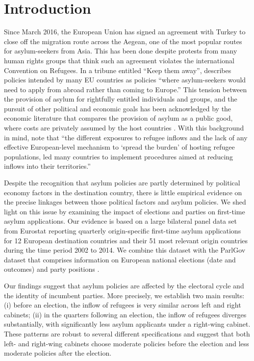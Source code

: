 \documentclass[a4paper,12pt]{article}
\begin{document}
\section{Introduction}\label{Introduction}
Since March 2016, the European Union has signed an agreement with Turkey to close off the migration route across the Aegean, one of the most popular routes for asylum-seekers from Asia. This has been done despite protests from many human rights groups that think such an agreement violates the international Convention on Refugees. In a tribune entitled ``Keep them away'', \textit{\cite{Economist2017}} describes policies intended by many EU countries as policies ``where asylum-seekers would need to apply from abroad rather than coming to Europe.'' This tension between the provision of asylum for rightfully entitled individuals and groups, and the pursuit of other political and economic goals has been acknowledged by the economic literature that compares the provision of asylum as a public good, where costs are privately assumed by the host countries \citep{moraga2014}. With this background in mind, \cite{dustmann2016} note that ``the  different  exposures  to  refugee  inflows and  the  lack  of  any  effective  European-level  mechanism  to  `spread  the  burden'  of  hosting  refugee  populations,  led  many  countries  to  implement  procedures  aimed  at  reducing  inflows  into  their  territories.''

Despite the recognition that asylum policies are partly determined by political economy factors in the destination country, there is little empirical evidence on the precise linkages between those political factors and asylum policies. We shed light on this issue by examining the impact of elections and parties on first-time asylum applications. Our evidence is based on a large bilateral panel data set from Eurostat reporting quarterly origin-specific first-time asylum applications for 12 European destination countries and their 51 most relevant origin countries during the time period 2002 to 2014. We combine this dataset with the ParlGov dataset that comprises information on European national elections (date and outcomes) and party positions \citep{parlgov2016}.

Our findings suggest that asylum policies are affected by the electoral cycle and the identity of incumbent parties. More precisely, we establish two main results:
(i) before an election, the inflow of refugees is very similar across left and right cabinets; 
(ii)  in the quarters following an election, the inflow of refugees diverges substantially, with significantly less asylum applicants under a right-wing cabinet. These patterns are robust to several different specifications and suggest that both left- and right-wing cabinets choose moderate policies before the election and less moderate policies after the election.
\end{document}
